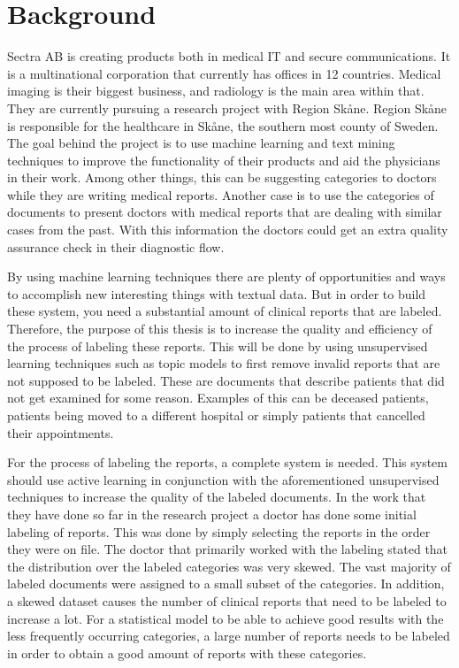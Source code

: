 \chapter{Background}
\label{cha:background}

Sectra AB is creating products both in medical IT and secure communications.
It is a multinational corporation that currently has offices in 12 countries.
Medical imaging is their biggest business, and radiology is the main area within that.
They are currently pursuing a research project with Region Skåne.
Region Skåne is responsible for the healthcare in Skåne, the southern most county of Sweden.
The goal behind the project is to use machine learning and text mining techniques to improve the functionality of their products and aid the physicians in their work.
Among other things, this can be suggesting categories to doctors while they are writing medical reports.
Another case is to use the categories of documents to present doctors with medical reports that are dealing with similar cases from the past.
With this information the doctors could get an extra quality assurance check in their diagnostic flow.

By using machine learning techniques there are plenty of opportunities and ways to accomplish new interesting things with textual data.
But in order to build these system, you need a substantial amount of clinical reports that are labeled.
Therefore, the purpose of this thesis is to increase the quality and efficiency of the process of labeling these reports.
This will be done by using unsupervised learning techniques such as topic models to first remove invalid reports that are not supposed to be labeled.
These are documents that describe patients that did not get examined for some reason.
Examples of this can be deceased patients, patients being moved to a different hospital or simply patients that cancelled their appointments.

For the process of labeling the reports, a complete system is needed.
This system should use active learning in conjunction with the aforementioned unsupervised techniques to increase the quality of the labeled documents.
In the work that they have done so far in the research project a doctor has done some initial labeling of reports.
This was done by simply selecting the reports in the order they were on file.
The doctor that primarily worked with the labeling stated that the distribution over the labeled categories was very skewed.
The vast majority of labeled documents were assigned to a small subset of the categories.
In addition, a skewed dataset causes the number of clinical reports that need to be labeled to increase a lot.
For a statistical model to be able to achieve good results with the less frequently occurring categories, a large number of reports needs to be labeled in order to obtain a good amount of reports with these categories.


